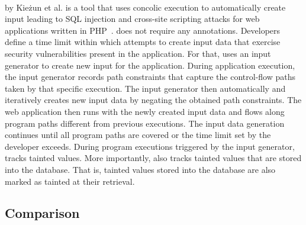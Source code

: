 \paragraph{\ardilla} by Kie{\.z}un et al. is a tool that uses
concolic execution to automatically create input leading to
SQL injection and cross-site scripting attacks for web
applications written in PHP~\cite{Kiezun:2009:Ardilla}.
\ardilla does not require any annotations. Developers
define a time limit within which \ardilla attempts to
create input data that exercise security vulnerabilities
present in the application. For that, \ardilla uses an input
generator to create new input for the application.
During application execution, the input generator records path
constraints that capture the control-flow paths taken by
that specific execution. The input generator then automatically
and iteratively creates new input data by negating the
obtained path constraints.
The web application then runs with the newly created
input data and flows along program paths different from
previous executions. The input data generation continues
until all program paths are covered or the time limit set
by the developer exceeds.
During program executions triggered by the input generator,
\ardilla tracks tainted values. More importantly, \ardilla
also tracks tainted values that are stored into the database.
That is, tainted values stored into the database are also
marked as tainted at their retrieval.

\subsection{Comparison}

